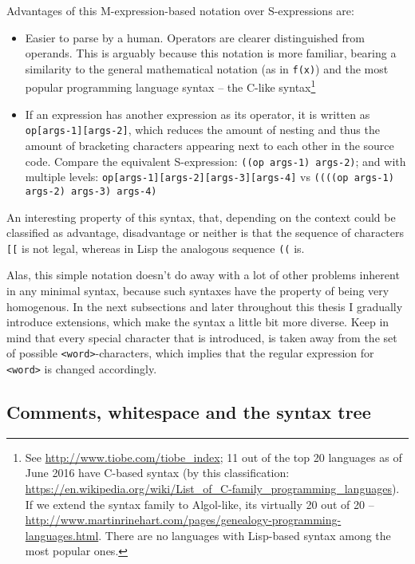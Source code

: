 Advantages of this M-expression-based notation over S-expressions are:
\begin{itemize}
    \item Easier to parse by a human. Operators are clearer distinguished from
      operands. This is arguably because this notation is more familiar, bearing
      a similarity to the general mathematical notation (as in \texttt{f(x)})
      and the most popular programming language syntax -- the C-like
      syntax\footnote{See \url{http://www.tiobe.com/tiobe_index}; 11 out of the
        top 20 languages as of June 2016 have C-based syntax (by this
        classification:
        \url{https://en.wikipedia.org/wiki/List_of_C-family_programming_languages}). If
        we extend the syntax family to Algol-like, its virtually 20 out of 20 --
        \url{http://www.martinrinehart.com/pages/genealogy-programming-languages.html}. There
        are no languages with Lisp-based syntax among the most popular ones.}
    \item If an expression has another expression as its operator, it is written
      as \texttt{op[args-1][args-2]}, which reduces the amount of nesting and
      thus the amount of bracketing characters appearing next to each other in
      the source code. Compare the equivalent S-expression: \texttt{((op args-1)
        args-2)}; and with multiple levels:
      \texttt{op[args-1][args-2][args-3][args-4]} vs \texttt{((((op args-1)
        args-2) args-3) args-4)}
\end{itemize}

An interesting property of this syntax, that, depending on the context could be
classified as advantage, disadvantage or neither is that the sequence of
characters \texttt{[[} is not legal, whereas in Lisp the analogous sequence
    \texttt{((} is.

Alas, this simple notation doesn't do away with a lot of other problems inherent
in any minimal syntax, because such syntaxes have the property of being very
homogenous. In the next subsections and later throughout this thesis I gradually
introduce extensions, which make the syntax a little bit more diverse. Keep in
mind that every special character that is introduced, is taken away from the set
of possible \texttt{<word>}-characters, which implies that the regular
expression for \texttt{<word>} is changed accordingly.

\subsection{Comments, whitespace and the syntax tree}\label{sub:comments}

